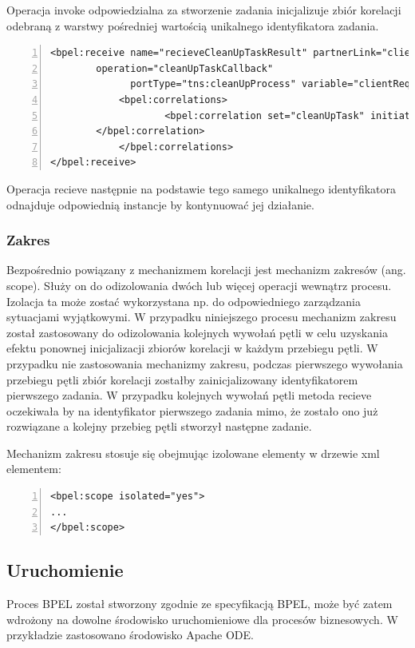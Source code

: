 Operacja invoke odpowiedzialna za stworzenie zadania inicjalizuje zbiór korelacji odebraną z warstwy pośredniej wartością unikalnego identyfikatora zadania.

\begin{lstlisting}[caption=Wykorzystanie zbiorów korelacji w aktywności receive.,numbers=left]
<bpel:receive name="recieveCleanUpTaskResult" partnerLink="client" 
		operation="cleanUpTaskCallback"
	          portType="tns:cleanUpProcess" variable="clientRequest">
            <bpel:correlations>
                	<bpel:correlation set="cleanUpTask" initiate="no">
		</bpel:correlation>    
            </bpel:correlations>
</bpel:receive>

\end{lstlisting}

 Operacja recieve następnie na podstawie tego samego unikalnego identyfikatora odnajduje odpowiednią instancje by kontynuować jej działanie. 

\subsubsection{Zakres }
Bezpośrednio powiązany z mechanizmem korelacji jest mechanizm zakresów (ang. scope). Służy on do odizolowania dwóch lub więcej operacji wewnątrz procesu. Izolacja ta może zostać wykorzystana np. do odpowiedniego zarządzania sytuacjami wyjątkowymi. W przypadku niniejszego procesu mechanizm zakresu został zastosowany do odizolowania kolejnych wywołań pętli w celu uzyskania efektu ponownej inicjalizacji zbiorów korelacji w każdym przebiegu pętli. W przypadku nie zastosowania mechanizmy zakresu, podczas pierwszego wywołania przebiegu pętli zbiór korelacji zostałby zainicjalizowany identyfikatorem pierwszego zadania. W przypadku kolejnych wywołań pętli metoda recieve oczekiwała by na identyfikator pierwszego zadania mimo, że zostało ono już rozwiązane a kolejny przebieg pętli stworzył następne zadanie. 

Mechanizm zakresu stosuje się obejmując izolowane elementy w drzewie xml elementem: 

\begin{lstlisting}[caption=Przykład zastosowania zakresu w BPEL.,numbers=left]
<bpel:scope isolated="yes">
...
</bpel:scope>
\end{lstlisting}

\subsection{Uruchomienie}
 Proces BPEL został stworzony zgodnie ze specyfikacją BPEL, może być zatem wdrożony na dowolne środowisko uruchomieniowe dla procesów biznesowych. W przykładzie zastosowano środowisko Apache ODE. 

